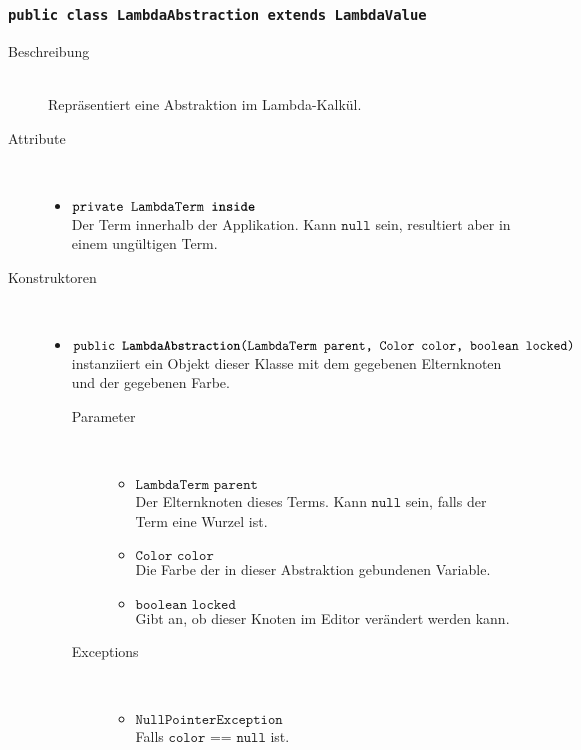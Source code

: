 \subsubsection{\normalfont \texttt{public class \textbf{LambdaAbstraction} extends LambdaValue}}

\begin{description}
\item[Beschreibung] \hfill \\ Repräsentiert eine Abstraktion im Lambda-Kalkül.
\item[Attribute] \hfill \\
	\vspace{-.8cm}
	\begin{itemize}
		\item $\texttt{private LambdaTerm \textbf{inside}}$ \\ Der Term innerhalb der Applikation. Kann $\texttt{null}$ sein, resultiert aber in einem ungültigen Term.
	\end{itemize}
	
\item[Konstruktoren] \hfill \\
	\vspace{-.8cm}
	\begin{itemize}
		\item $\texttt{public \textbf{LambdaAbstraction}(LambdaTerm parent, Color color, boolean locked)}$ \\ instanziiert ein Objekt dieser Klasse mit dem gegebenen Elternknoten und der gegebenen Farbe.
		\begin{description}
			\item[Parameter] \hfill \\
			\vspace{-.8cm}
			\begin{itemize}
				\item $\texttt{LambdaTerm parent}$ \\ Der Elternknoten dieses Terms. Kann $\texttt{null}$ sein, falls der Term eine Wurzel ist.
				\item $\texttt{Color color}$ \\ Die Farbe der in dieser Abstraktion gebundenen Variable.
				\item $\texttt{boolean locked}$ \\ Gibt an, ob dieser Knoten im Editor verändert werden kann.
			\end{itemize}
			\item[Exceptions] \hfill \\
			\vspace{-.8cm}
			\begin{itemize}
				\item $\texttt{NullPointerException}$ \\ Falls $\texttt{color == null}$ ist.
			\end{itemize}
		\end{description}
	\end{itemize}
	

\end{description}
